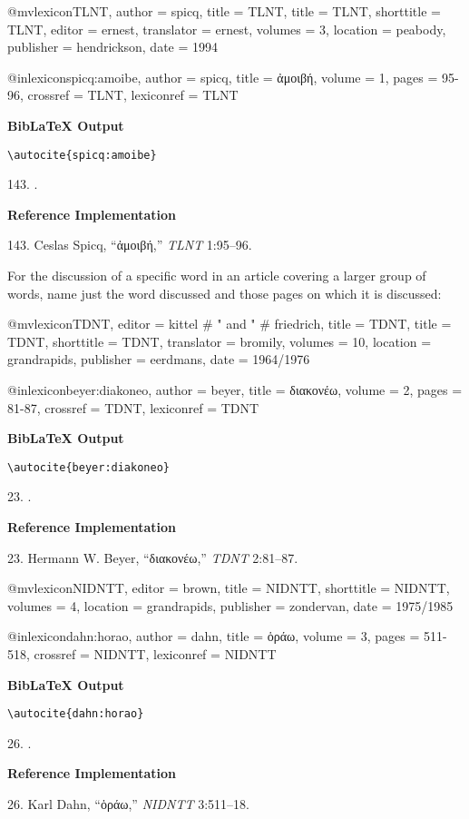 \documentclass[a4paper]{article}
\newcommand{\gr}[1]{{\greekfont #1}}
\newcommand\citetestlex[2]{%
  {\textbf{BibLaTeX Output}\par
   \nobreak
   \texttt{\textbackslash autocite\{#2\}}\par
   \color{biblatex-colour}
   #1. \cite{#2}.\par}}
\newenvironment{refimp}{%
  \begin{minipage}{\linewidth}
    \setlength{\parskip}{1ex}
    \textbf{Reference Implementation}\par
    \nobreak
    \color{reference-colour}
}{\end{minipage}}
\newenvironment{vb}{%
  \setlength{\parskip}{0pt}
  \verbatim}{\endverbatim}
\begin{document}
\begin{vb}
@mvlexicon{TLNT,
  author = spicq,
  title = TLNT,
  title = TLNT,
  shorttitle = {TLNT},
  editor = ernest,
  translator = ernest,
  volumes = {3},
  location = peabody,
  publisher = hendrickson,
  date = {1994}
}

@inlexicon{spicq:amoibe,
  author = spicq,
  title = {\gr{ἀμοιβή}},
  volume = {1},
  pages = {95-96},
  crossref = {TLNT},
  lexiconref = {TLNT}
}
\end{vb}

\citetestlex{143}{spicq:amoibe}

\begin{refimp}
  143. Ceslas Spicq, “\gr{ἀμοιβή},” \emph{TLNT} 1:95–96.
\end{refimp}

\bigskip

For the discussion of a specific word in an article covering a larger group of
words, name just the word discussed and those pages on which it is discussed:

\begin{vb}
@mvlexicon{TDNT,
  editor = kittel # " and " # friedrich,
  title = TDNT,
  title = TDNT,
  shorttitle = {TDNT},
  translator = bromily,
  volumes = {10},
  location = grandrapids,
  publisher = eerdmans,
  date = {1964/1976}
}

@inlexicon{beyer:diakoneo,
  author = beyer,
  title = {\gr{διακονέω}},
  volume = {2},
  pages = {81-87},
  crossref = {TDNT},
  lexiconref = {TDNT}
}
\end{vb}

\citetestlex{23}{beyer:diakoneo}

\begin{refimp}
  23. Hermann W. Beyer, “\gr{διακονέω},” \emph{TDNT} 2:81–87.
\end{refimp}

\begin{vb}
@mvlexicon{NIDNTT,
  editor = brown,
  title = NIDNTT,
  shorttitle = {NIDNTT},
  volumes = {4},
  location = grandrapids,
  publisher = zondervan,
  date = {1975/1985}
}

@inlexicon{dahn:horao,
  author = dahn,
  title = {\gr{ὁράω}},
  volume = {3},
  pages = {511-518},
  crossref = {NIDNTT},
  lexiconref = {NIDNTT}
}
\end{vb}

\citetestlex{26}{dahn:horao}

\begin{refimp}
  26. Karl Dahn, “\gr{ὁράω},” \emph{NIDNTT} 3:511–18.
\end{refimp}
\end{document}
